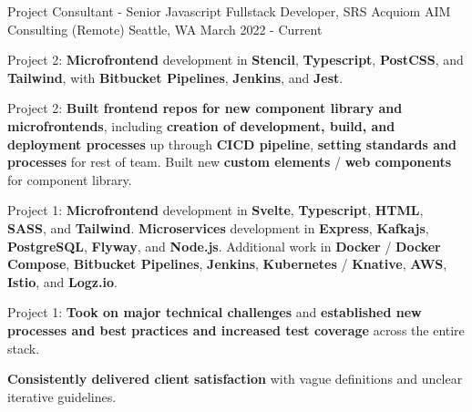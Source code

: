\begin{cventries}
\cventry
{Project Consultant - Senior Javascript Fullstack Developer, SRS Acquiom} %
{AIM Consulting (Remote)} %
{Seattle, WA} %
{March 2022 - Current} %
{
\begin{cvitems}
\item {Project 2: \textbf{Microfrontend} development in \textbf{Stencil}, \textbf{Typescript}, \textbf{PostCSS}, and \textbf{Tailwind}, with \textbf{Bitbucket Pipelines}, \textbf{Jenkins}, and \textbf{Jest}.}
\item {Project 2: \textbf{Built frontend repos for new component library and microfrontends}, including \textbf{creation of development, build, and deployment processes} up through \textbf{CICD pipeline}, \textbf{setting standards and processes} for rest of team. Built new \textbf{custom elements} / \textbf{web components} for component library.}
\item {Project 1: \textbf{Microfrontend} development in \textbf{Svelte}, \textbf{Typescript}, \textbf{HTML}, \textbf{SASS}, and \textbf{Tailwind}. \textbf{Microservices} development in \textbf{Express}, \textbf{Kafkajs}, \textbf{PostgreSQL}, \textbf{Flyway}, and \textbf{Node.js}. Additional work in \textbf{Docker} / \textbf{Docker Compose}, \textbf{Bitbucket Pipelines}, \textbf{Jenkins}, \textbf{Kubernetes} / \textbf{Knative}, \textbf{AWS}, \textbf{Istio}, and \textbf{Logz.io}.}
\item {Project 1: \textbf{Took on major technical challenges} and \textbf{established new processes and best practices and increased test coverage} across the entire stack.}
\item {\textbf{Consistently delivered client satisfaction} with vague definitions and unclear iterative guidelines.}
\end{cvitems}
}


\end{cventries}
